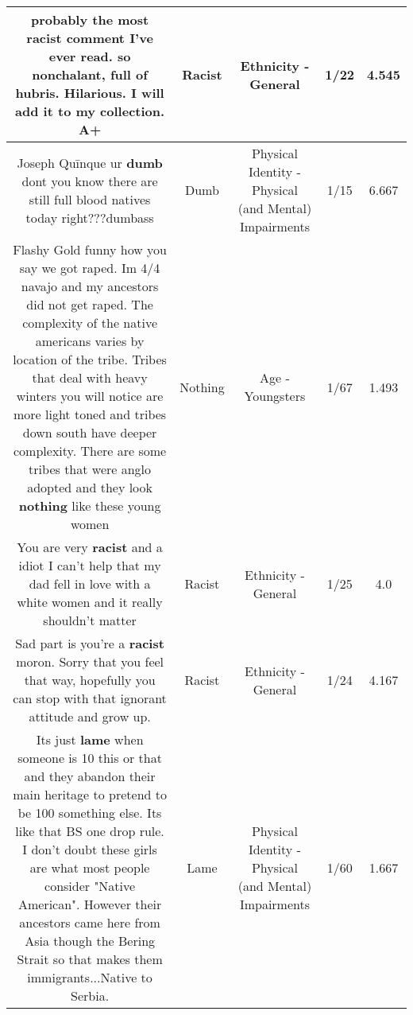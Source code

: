 \documentclass[11pt]{article}
\newlength\mylength
\begin{document}
\begin{center}
\begin{longtable}{|C{.65\mylength}|C{.30\mylength}|C{.12\mylength}|C{.12\mylength}|C{.12\mylength}|}
  \small probably the most \textbf{racist} comment I've ever read. so nonchalant, full of hubris. Hilarious. I will add it to my collection. A+\normalsize   & Racist & Ethnicity - General & 1/22 & 4.545 \\  \hline
  \small Joseph Quīnque ur \textbf{dumb} dont you know there are still full blood natives today right???dumbass\normalsize   & Dumb & Physical Identity - Physical (and Mental) Impairments & 1/15 & 6.667 \\  \hline
  \small Flashy Gold funny how you say we got raped. Im 4/4 navajo and my ancestors did not get raped. The complexity of the native americans varies by location of the tribe. Tribes that deal with heavy winters you will notice are more light toned and tribes down south have deeper complexity. There are some tribes that were anglo adopted and they look \textbf{nothing} like these young women\normalsize   & Nothing & Age - Youngsters & 1/67 & 1.493 \\  \hline
  \small You are very \textbf{racist} and a idiot I can't help that my dad fell in love with a white women and it really shouldn't matter\normalsize   & Racist & Ethnicity - General & 1/25 & 4.0 \\  \hline
  \small Sad part is you're a \textbf{racist} moron. Sorry that you feel that way, hopefully you can stop with that ignorant attitude and grow up.\normalsize   & Racist & Ethnicity - General & 1/24 & 4.167 \\  \hline
  \small Its just \textbf{lame} when someone is 10 this or that and they abandon their main heritage to pretend to be 100 something else. Its like that BS one drop rule. I don't doubt these girls are what most people consider "Native American". However their ancestors came here from Asia though the Bering Strait so that makes them immigrants...Native to Serbia.\normalsize   & Lame & Physical Identity - Physical (and Mental) Impairments & 1/60 & 1.667 \\  \hline

\end{longtable}
\end{center}
\end{document}
